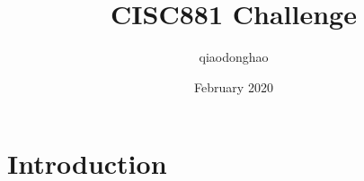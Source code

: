 \documentclass{article}
\title{CISC881 Challenge}
\author{qiaodonghao }
\date{February 2020}
\begin{document}
\maketitle

\section{Introduction}
\end{document}
